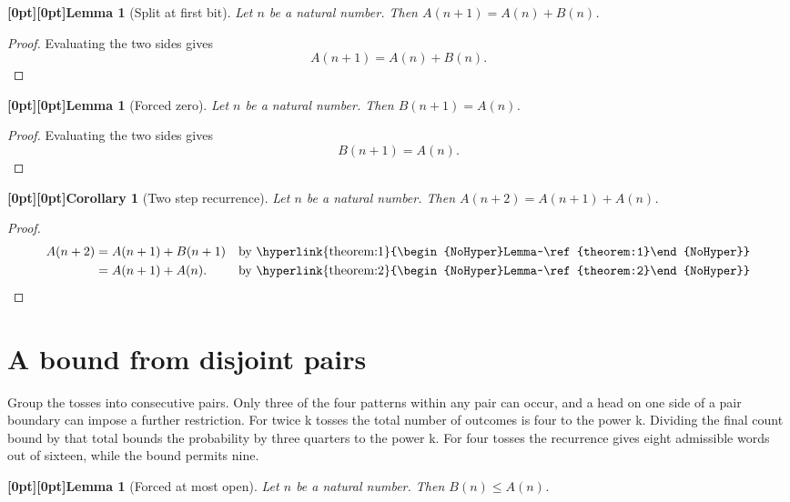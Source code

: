 \documentclass{article}
\makeatletter
\newcommand{\paperanchor}[1]{\hypertarget{#1}{}}%
\newcommand{\paperlink}[2]{\hyperlink{#1}{\begin{NoHyper}#2\end{NoHyper}}}%
\def\paperdest{\pdfextension dest}\def\paperstart{\pdfextension startlink}%
\def\paperend{\pdfextension endlink}\def\papercolor{\pdfextension colorstack}%
\let\paperdest\pdfdest\let\paperstart\pdfstartlink\let\paperend\pdfendlink\let\papercolor\pdfcolorstack
\newcommand{\paperanchor}[1]{\paperdest name{#1} xyz}%
\newcommand{\paperlink}[2]{\leavevmode\paperstart attr{/Border [0 0 0]} goto name{#1}%
      \papercolor 0 push {0.10 0.25 0.42 rg 0.10 0.25 0.42 RG}#2\papercolor 0 pop\paperend}%
\newcommand{\paperanchor}[1]{\special{pdf:dest (#1) [@thispage /XYZ null @ypos null]}}%
\newcommand{\paperlink}[2]{\leavevmode\special{pdf:bann << /Subtype /Link /Border [0 0 0] /A << /S /GoTo /D (#1) >> >>}%
      \special{color push rgb 0.10 0.25 0.42}#2\special{color pop}\special{pdf:eann}}%
\newcommand{\paperlineanchor}[1]{\raisebox{10pt}[0pt][0pt]{\paperanchor{#1}}}
\DeclareRobustCommand{\paperresultname}[1]{\paperlineanchor{theorem:\arabic{theorem}}#1}
\theoremstyle{paperresult}
\newtheorem{lemma}[theorem]{\paperresultname{Lemma}}
\newtheorem{corollary}[theorem]{\paperresultname{Corollary}}
\makeatother
\begin{document}
\begin{lemma}[{Split at first bit}]\label{theorem:1}
Let \(n\) be a natural number. Then \(A(n + 1) = A(n) + B(n)\).
\end{lemma}

\begin{proof}
Evaluating the two sides gives
\[
A(n + 1) = A(n) + B(n).
\]
\end{proof}

\begin{lemma}[{Forced zero}]\label{theorem:2}
Let \(n\) be a natural number. Then \(B(n + 1) = A(n)\).
\end{lemma}

\begin{proof}
Evaluating the two sides gives
\[
B(n + 1) = A(n).
\]
\end{proof}

\begin{corollary}[{Two step recurrence}]\label{theorem:3}
Let \(n\) be a natural number. Then \(A(n + 2) = A(n + 1) + A(n)\).
\end{corollary}

\begin{proof}
\begin{align*}
A(n + 2) &= A(n + 1) + B(n + 1) && \text{by \paperlink{theorem:1}{Lemma~\ref{theorem:1}}} \\
 &= A(n + 1) + A(n). && \text{by \paperlink{theorem:2}{Lemma~\ref{theorem:2}}}
\end{align*}
\end{proof}

\section{A bound from disjoint pairs}
Group the tosses into consecutive pairs. Only three of the four patterns within any pair can occur, and a head on one side of a pair boundary can impose a further restriction. For twice k tosses the total number of outcomes is four to the power k. Dividing the final count bound by that total bounds the probability by three quarters to the power k. For four tosses the recurrence gives eight admissible words out of sixteen, while the bound permits nine.

\begin{lemma}[{Forced at most open}]\label{theorem:4}
Let \(n\) be a natural number. Then \(B(n) \le A(n)\).
\end{lemma}
\end{document}
